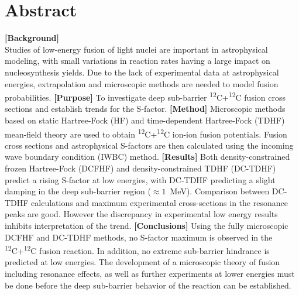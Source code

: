 \date{\today}

\section*{Abstract}
\edef\oldrightskip{\the\rightskip}

	\rightskip\oldrightskip\relax
	\setlength{\parskip}{0pt}
	{\bf [Background]} \\ Studies of low-energy fusion of light nuclei are important in astrophysical modeling, with small variations in reaction rates having a large impact on nucleosynthesis yields. Due to the lack of experimental data at astrophysical energies, extrapolation and microscopic methods are needed to model fusion probabilities.
	{\bf [Purpose]} To investigate deep sub-barrier \textsuperscript{12}C+\textsuperscript{12}C fusion cross sections and establish trends for the S-factor.
	{\bf [Method]} Microscopic methods based on static Hartree-Fock (HF) and time-dependent Hartree-Fock (TDHF) mean-field theory are used to obtain \textsuperscript{12}C+\textsuperscript{12}C ion-ion fusion potentials. Fusion cross sections and astrophysical S-factors are then calculated using the incoming wave boundary condition (IWBC) method.
	{\bf [Results]} Both density-constrained frozen Hartree-Fock (DCFHF) and density-constrained TDHF (DC-TDHF) predict a rising S-factor at low energies, with DC-TDHF predicting a slight damping in the deep sub-barrier region ($\approx1$~MeV). Comparison between  DC-TDHF calculations and maximum experimental cross-sections in the resonance peaks are good. However the discrepancy in experimental low energy results inhibits interpretation of the trend.
	{\bf [Conclusions]} Using the fully microscopic DCFHF and DC-TDHF methods, no S-factor maximum is observed in the \textsuperscript{12}C+\textsuperscript{12}C fusion reaction. In addition, no extreme sub-barrier hindrance is predicted at low energies. The development of a microscopic theory of fusion including resonance effects, as well as further experiments at lower energies must be done before the deep sub-barrier behavior of the reaction can be established. 





